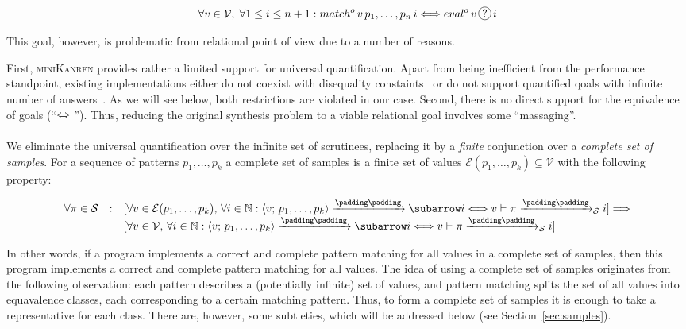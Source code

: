 \[
\forall v\in \mathcal V,\; \forall 1\le i\le n+1 : match^o\,v\,p_1,\dots,p_n\,i\Longleftrightarrow eval^o\,v\,\circled{?}\,i
\]

This goal, however, is problematic from relational point of view due to a number of reasons.

First, \textsc{miniKanren} provides rather a limited support for universal quantification. Apart from being inefficient from
the performance standpoint, existing implementations either do not coexist with disequality constaints~\cite{eigen}
or do not support quantified qoals with infinite number of answers~\cite{moiseenko}. As we will see below, both restrictions are
violated in our case. Second, there is no direct support for the equivalence of goals (``$\xLeftrightarrow{}{}$''). Thus,
reducing the original synthesis problem to a viable relational goal involves some ``massaging''.

We eliminate the universal quantification over the infinite set of scrutinees, replacing it by a \emph{finite}
conjunction over a \emph{complete set of samples}. For a sequence of patterns $p_1,\dots,p_k$ a
complete set of samples is a finite set of values $\mathcal{E}(p_1,\dots,p_k)\subseteq\mathcal{V}$ with the following
property:

\[
\setarrow{\xrightarrow}
\begin{array}{rcl}
  \forall\pi\in\mathcal S & : & [\forall v\in\mathcal{E}(p_1,\dots,p_k),\,\forall i\in\mathbb{N} : \trans{\inbr{v;\,p_1,\dots,p_k}}{}{i} \Longleftrightarrow {\setsubarrow{_{\mathcal S}}\withenv{v}{\trans{\pi}{}{i}}}] \Longrightarrow \\
                          &   & [\forall v\in\mathcal V,\,\forall i\in\mathbb{N} : \trans{\inbr{v;\,p_1,\dots,p_k}}{}{i} \Longleftrightarrow  {\setsubarrow{_{\mathcal S}}\withenv{v}{\trans{\pi}{}{i}}}]
\end{array}
\]

In other words, if a program implements a correct and complete pattern matching for all values in a complete set of samples, then this
program implements a correct and complete pattern matching for all values. The idea of using a complete set of samples originates from the following observation: each pattern
describes a (potentially infinite) set of values, and pattern matching splits the set of all values into equavalence classes, each corresponding to a certain matching pattern. Thus,
to form a complete set of samples it is enough to take a representative for each class. There are, however, some subtleties, which will be addressed below (see Section~\ref{sec:samples}).

